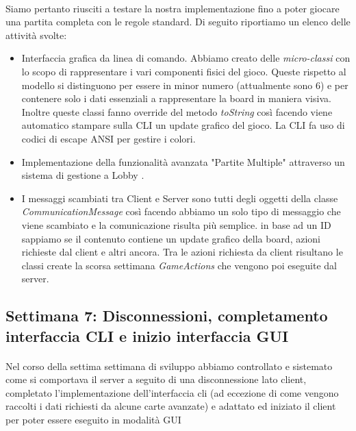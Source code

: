 \documentclass[a4paper, 12pt]{article}
\begin{document}
	\paragraph{}
	Siamo pertanto riusciti a testare la nostra implementazione fino a poter giocare una partita completa con le regole standard. Di seguito riportiamo un elenco delle attività svolte:\\
	\begin{itemize}
		\item Interfaccia grafica da linea di comando. Abbiamo creato delle \textit{micro-classi} con lo scopo di rappresentare i vari componenti fisici del gioco. Queste rispetto al modello si distinguono per essere in minor numero (attualmente sono 6) e per contenere solo i dati essenziali a rappresentare la board in maniera visiva. Inoltre queste classi fanno override del metodo \textit{toString} così facendo viene automatico stampare sulla CLI un update grafico del gioco. La CLI fa uso di codici di escape ANSI per gestire i colori.
		\item Implementazione della funzionalità avanzata "Partite Multiple" attraverso un sistema di gestione a Lobby .
		\item I messaggi scambiati tra Client e Server sono tutti degli oggetti della classe \textit{CommunicationMessage} così facendo abbiamo un solo tipo di messaggio che viene scambiato e la comunicazione risulta più semplice. in base ad un ID sappiamo se il contenuto contiene un update grafico della board, azioni richieste dal client e altri ancora. Tra le azioni richiesta da client risultano le classi create la scorsa settimana \textit{GameActions} che vengono poi eseguite dal server.
	\end{itemize}

	\newpage
	\subsection{Settimana 7: Disconnessioni, completamento interfaccia CLI e inizio interfaccia GUI}
	\paragraph{}
	Nel corso della settima settimana di sviluppo abbiamo controllato e sistemato come si comportava il server a seguito di una disconnessione lato client, completato l'implementazione dell'interfaccia cli (ad eccezione di come vengono raccolti i dati richiesti da alcune carte avanzate) e adattato ed iniziato il client per poter essere eseguito in modalità GUI\\
	 
\end{document}
